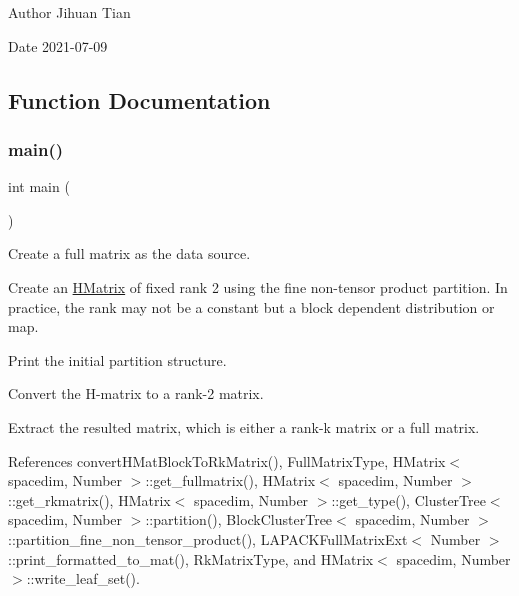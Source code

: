 \begin{DoxyAuthor}{Author}
Jihuan Tian 
\end{DoxyAuthor}
\begin{DoxyDate}{Date}
2021-\/07-\/09 
\end{DoxyDate}


\subsection{Function Documentation}
\mbox{\label{hmatrix-rkmatrix-conversion_8cc_ae66f6b31b5ad750f1fe042a706a4e3d4}} 
\subsubsection{\texorpdfstring{main()}{main()}}
{\footnotesize\ttfamily int main (\begin{DoxyParamCaption}{ }\end{DoxyParamCaption})}

Create a full matrix as the data source.

Create an \hyperlink{classHMatrix}{H\+Matrix} of fixed rank 2 using the fine non-\/tensor product partition. In practice, the rank may not be a constant but a block dependent distribution or map.

Print the initial partition structure.

Convert the H-\/matrix to a rank-\/2 matrix.

Extract the resulted matrix, which is either a rank-\/k matrix or a full matrix.

References convert\+H\+Mat\+Block\+To\+Rk\+Matrix(), Full\+Matrix\+Type, H\+Matrix$<$ spacedim, Number $>$\+::get\+\_\+fullmatrix(), H\+Matrix$<$ spacedim, Number $>$\+::get\+\_\+rkmatrix(), H\+Matrix$<$ spacedim, Number $>$\+::get\+\_\+type(), Cluster\+Tree$<$ spacedim, Number $>$\+::partition(), Block\+Cluster\+Tree$<$ spacedim, Number $>$\+::partition\+\_\+fine\+\_\+non\+\_\+tensor\+\_\+product(), L\+A\+P\+A\+C\+K\+Full\+Matrix\+Ext$<$ Number $>$\+::print\+\_\+formatted\+\_\+to\+\_\+mat(), Rk\+Matrix\+Type, and H\+Matrix$<$ spacedim, Number $>$\+::write\+\_\+leaf\+\_\+set().

